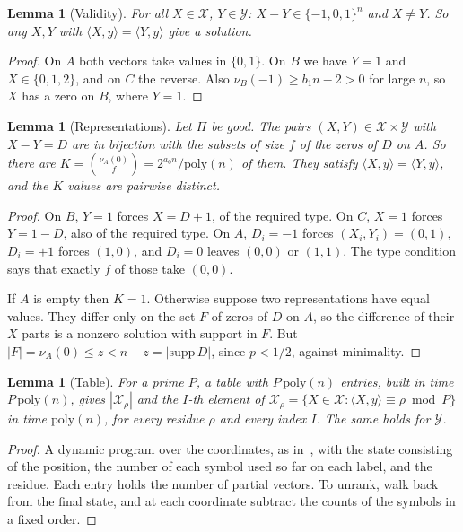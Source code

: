 \documentclass[11pt]{article}
\newtheorem{lemma}[theorem]{Lemma}
\theoremstyle{remark}
\newcommand{\Xs}{\mathcal X}
\newcommand{\Ys}{\mathcal Y}
\newcommand{\ip}[2]{\langle #1,#2\rangle}
\begin{document}
\begin{lemma}[Validity]\label{lem:valid}
For all $X\in\Xs$, $Y\in\Ys$: $X-Y\in\{-1,0,1\}^n$ and $X\ne Y$. So any $X,Y$ with $\ip Xy=\ip Yy$ give a solution.
\end{lemma}
\begin{proof}
On $A$ both vectors take values in $\{0,1\}$. On $B$ we have $Y=1$ and $X\in\{0,1,2\}$, and on $C$ the reverse. Also $\nu_B(-1)\ge b_1n-2>0$ for large $n$, so $X$ has a zero on $B$, where $Y=1$.
\end{proof}

\begin{lemma}[Representations]\label{lem:reps}
Let $\Pi$ be good. The pairs $(X,Y)\in\Xs\times\Ys$ with $X-Y=D$ are in bijection with the subsets of size $f$ of the zeros of $D$ on $A$. So there are $K=\binom{\nu_A(0)}{f}=2^{a_0n}/\mathrm{poly}(n)$ of them. They satisfy $\ip Xy=\ip Yy$, and the $K$ values are pairwise distinct.
\end{lemma}
\begin{proof}
On $B$, $Y=1$ forces $X=D+1$, of the required type. On $C$, $X=1$ forces $Y=1-D$, also of the required type. On $A$, $D_i=-1$ forces $(X_i,Y_i)=(0,1)$, $D_i=+1$ forces $(1,0)$, and $D_i=0$ leaves $(0,0)$ or $(1,1)$. The type condition says that exactly $f$ of those take $(0,0)$.

If $A$ is empty then $K=1$. Otherwise suppose two representations have equal values. They differ only on the set $F$ of zeros of $D$ on $A$, so the difference of their $X$ parts is a nonzero solution with support in $F$. But $|F|=\nu_A(0)\le z<n-z=|\mathrm{supp}\,D|$, since $p<1/2$, against minimality.
\end{proof}

\begin{lemma}[Table]\label{lem:table}
For a prime $P$, a table with $P\,\mathrm{poly}(n)$ entries, built in time $P\,\mathrm{poly}(n)$, gives $|\Xs_\rho|$ and the $I$-th element of $\Xs_\rho=\{X\in\Xs:\ip Xy\equiv\rho\bmod P\}$ in time $\mathrm{poly}(n)$, for every residue $\rho$ and every index $I$. The same holds for $\Ys$.
\end{lemma}
\begin{proof}
A dynamic program over the coordinates, as in~\cite[Theorem 3.5]{AHJKS22}, with the state consisting of the position, the number of each symbol used so far on each label, and the residue. Each entry holds the number of partial vectors. To unrank, walk back from the final state, and at each coordinate subtract the counts of the symbols in a fixed order.
\end{proof}
\end{document}
